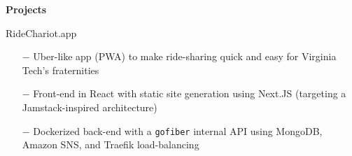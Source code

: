 \documentclass{article}
\newcommand{\code}[1]{\texttt{#1}} %
\begin{document}
{%
% 
% 
% 
% 

\setlength{\leftskip}{0cm}
\textbf{\large{Projects}} 

\vspace{5pt}

{\setlength{\leftskip}{15pt}

	{\selectfont RideChariot.app}
	\vspace{-5pt}
	\begin{itemize}
		\setlength{\leftskip}{15pt}
		\setlength\itemsep{-0.5em}
		\item[$-$] Uber-like app (PWA) to make ride-sharing quick and easy for Virginia Tech's fraternities
		\item[$-$] Front-end in React with static site generation using Next.JS (targeting a Jamstack-inspired architecture)
		\item[$-$] Dockerized back-end with a \code{gofiber} internal API using MongoDB, Amazon SNS, and Traefik load-balancing
	\end{itemize}

}}
\end{document}
